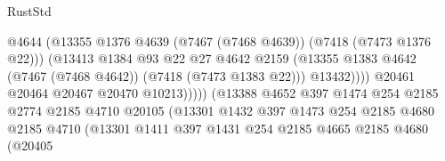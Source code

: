 \begin{lexlean}{RustStd}
\begin{coremodule}
                                                @4644
                                                (@13355
                                                  @1376
                                                  @4639
                                                  (@7467 (@7468 @4639))
                                                  (@7418 (@7473 @1376 @22)))
                                                (@13413
                                                  @1384
                                                  @93
                                                  @22
                                                  @27
                                                  @4642
                                                  @2159
                                                  (@13355
                                                    @1383
                                                    @4642
                                                    (@7467 (@7468 @4642))
                                                    (@7418 (@7473 @1383 @22)))
                                                  @13432))))
                                          @20461
                                          @20464
                                          @20467
                                          @20470
                                          @10213)))))
                                (@13388
                                  @4652
                                  @397
                                  @1474
                                  @254
                                  @2185
                                  @2774
                                  @2185
                                  @4710
                                  @20105
                                  (@13301
                                    @1432
                                    @397
                                    @1473
                                    @254
                                    @2185
                                    @4680
                                    @2185
                                    @4710
                                    (@13301
                                      @1411
                                      @397
                                      @1431
                                      @254
                                      @2185
                                      @4665
                                      @2185
                                      @4680
                                      (@20405

\end{coremodule}
\end{lexlean}
